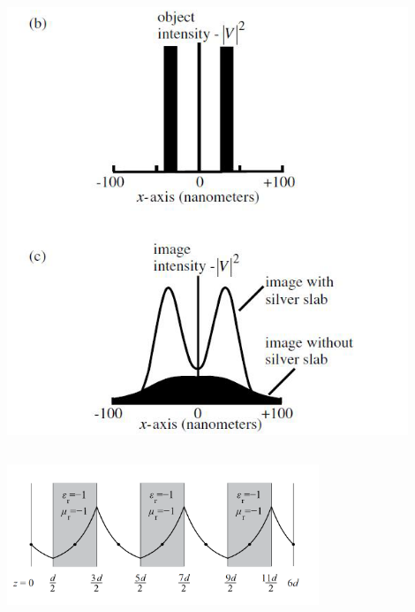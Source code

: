 \documentclass[9pt, compress, xcolor=table]{beamer}
\begin{document}
\begin{frame}[fragile]
\begin{columns}[c]
\begin{center}
\includegraphics[width=0.9\textwidth]{pendry3}
\end{center}
\end{columns}

\begin{center}
\includegraphics[width=0.7\textwidth]{neg_ref_40b}
\end{center}

\end{frame}
\end{document}
